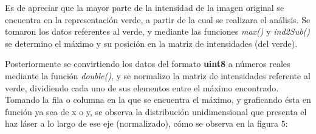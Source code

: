 \documentclass[11pt,letterpaper,twocolumn]{article}
\begin{document}
\par 
Es de apreciar que la mayor parte de la intensidad de la imagen original se encuentra en la representación verde, a partir de la cual se realizara el análisis. Se tomaron los datos referentes al verde, y mediante las funciones \textit{max()} y \textit{ind2Sub()} se determino el máximo y su posición en la matriz de intensidades (del verde).\\
\par 
Posteriormente se convirtiendo los datos del formato \textbf{uint8} a números reales mediante la función \textit{double()}, y se normalizo la matriz de intensidades referente al verde, dividiendo cada uno de sus elementos entre el máximo encontrado. Tomando la fila o columna en la que se encuentra el máximo, y graficando ésta en función ya sea de x o y, se observa la distribución unidimensional que presenta el haz láser a lo largo de ese eje (normalizado), cómo se observa en la figura $5$: 
\end{document}
